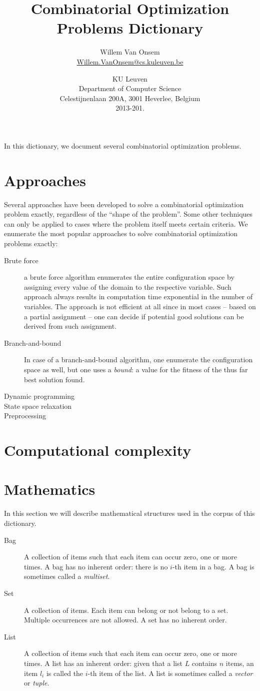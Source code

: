 \documentclass{../SharedData/dictionaryclass}
\title{Combinatorial Optimization Problems Dictionary}
\author{Willem Van Onsem\\\href{mailto:Willem.VanOnsem@cs.kuleuven.be}{Willem.VanOnsem@cs.kuleuven.be}}
\date{KU Leuven\\Department of Computer Science\\Celestijnenlaan 200A, 3001 Heverlee, Belgium\\2013-201.}
\newcommand{\nmn}[1]{\index{#1}\emph{#1}}
\begin{document}
\clearpage{}
In this dictionary, we document several combinatorial optimization problems.
\section*{Approaches}
Several approaches have been developed to solve a combinatorial optimization problem exactly, regardless of the ``shape of the problem''. Some other techniques can only be applied to cases where the problem itself meets certain criteria. We enumerate the most popular approaches to solve combinatorial optimization problems exactly:
\begin{description}
 \item [Brute force] a brute force algorithm enumerates the entire configuration space by assigning every value of the domain to the respective variable. Such approach always results in computation time exponential in the number of variables. The approach is not efficient at all since in most cases -- based on a partial assignment -- one can decide if potential good solutions can be derived from such assignment.
 \item [Branch-and-bound] In case of a branch-and-bound algorithm, one enumerate the configuration space as well, but one uses a \nmn{bound}: a value for the fitness of the thus far best solution found.
 \item [Dynamic programming]
 \item [State space relaxation]
 \item [Preprocessing]
\end{description}
\section*{Computational complexity}
\glsaddall
\printglossaries
\clearpage{}
\section*{Mathematics}
In this section we will describe mathematical structures used in the corpus of this dictionary.
\begin{description}
 \item [Bag] A collection of items such that each item can occur zero, one or more times. A bag has no inherent order: there is no $i$-th item in a bag. A bag is sometimes called a \nmn{multiset}.
 \item [Set] A collection of items. Each item can belong or not belong to a set. Multiple occurrences are not allowed. A set has no inherent order.
 \item [List] A collection of items such that each item can occur zero, one or more times. A list has an inherent order: given that a list $L$ contains $n$ items, an item $l_i$ is called the $i$-th item of the list. A list is sometimes called a \nmn{vector} or \nmn{tuple}.
\end{description}
\end{document}
